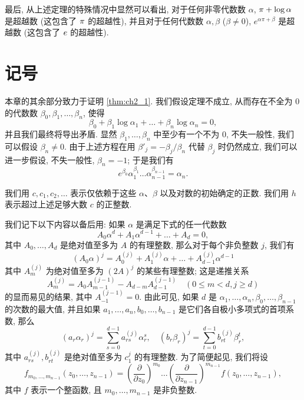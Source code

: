 最后, 从上述定理的特殊情况中显然可以看出, 对于任何非零代数数 $\alpha$, $\pi\index{transcendence of  $\pi$} + \log \alpha$ 是超越数 (这包含了 $\pi\index{transcendence of  $\pi$}$ 的超越性), 并且对于任何代数数 $\alpha, \beta$ ($\beta \neq 0$), $e^{\alpha\pi+\beta}$ 是超越数 (这包含了 $e\index{transcendence of e}$ 的超越性).

\section{记号}

本章的其余部分致力于证明 \autoref{thm:ch2_1}. 我们假设定理不成立, 从而存在不全为 $0$ 的代数数 $\beta_0, \beta_1, \dots, \beta_n$, 使得
\[
\beta_0 + \beta_1 \log \alpha_1 + \dots + \beta_n \log \alpha_n = 0,
\]
并且我们最终将导出矛盾. 显然 $\beta_1, \dots, \beta_n$ 中至少有一个不为 $0$, 不失一般性, 我们可以假设 $\beta_n \neq 0$. 由于上述方程在用 $\beta'_j = -\beta_j/\beta_n$ 代替 $\beta_j$ 时仍然成立, 我们可以进一步假设, 不失一般性, $\beta_n = -1$; 于是我们有
\begin{equation} \label{eq:ch2_1}\tag{1}
e^{\beta_0}\alpha_1^{\beta_1}\dots\alpha_{n-1}^{\beta_{n-1}}=\alpha_n.
\end{equation}

我们用 $c, c_1, c_2, \dots$ 表示仅依赖于这些 $\alpha$、$\beta$ 以及对数的初始确定的正数. 我们用 $h$ 表示超过上述足够大数 $c$ 的正整数.

我们记下以下内容以备后用: 如果 $\alpha$ 是满足下式的任一代数数
\[
A_0 \alpha^d + A_1 \alpha^{d-1} + \dots + A_d = 0,
\]
其中 $A_0, \dots, A_d$ 是绝对值至多为 $A$ 的有理整数, 那么对于每个非负整数 $j$, 我们有
\[
(A_0\alpha)^j = A_0^{(j)} + A_1^{(j)}\alpha + \dots + A_{d-1}^{(j)}\alpha^{d-1}
\]
其中 $A_m^{(j)}$ 为绝对值至多为 $(2A)^j$ 的某些有理整数; 这是递推关系
\[
A_m^{(j)} = A_0 A_{m-1}^{(j-1)} - A_{d-m} A_{d-1}^{(j-1)} \quad (0 \le m < d, j \ge d)
\]
的显而易见的结果, 其中 $A_{-1}^{(j-1)}=0$. 由此可见, 如果 $d$ 是 $\alpha_1, \dots, \alpha_n, \beta_0, \dots, \beta_{n-1}$ 的次数的最大值, 并且如果 $a_1, \dots, a_n, b_0, \dots, b_{n-1}$ 是它们各自极小多项式的首项系数, 那么
\begin{equation} \label{eq:ch2_2}\tag{2}
(a_r \alpha_r)^j = \sum_{s=0}^{d-1} a_{rs}^{(j)} \alpha_r^s, \quad (b_r \beta_r)^j = \sum_{t=0}^{d-1} b_{rt}^{(j)} \beta_r^t,
\end{equation}
其中 $a_{rs}^{(j)}, b_{rt}^{(j)}$ 是绝对值至多为 $c_1^j$ 的有理整数. 为了简便起见, 我们将设
\[
f_{m_0, \dots, m_{n-1}}(z_0, \dots, z_{n-1}) = \left(\frac{\partial}{\partial z_0}\right)^{m_0} \dots \left(\frac{\partial}{\partial z_{n-1}}\right)^{m_{n-1}} f(z_0, \dots, z_{n-1}),
\]
其中 $f$ 表示一个整函数, 且 $m_0, \dots, m_{n-1}$ 是非负整数.

